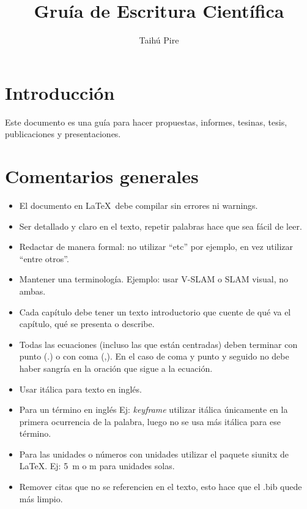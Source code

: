 \documentclass[a4paper,	11pt]{article}
\begin{document}
\title{Gruía de Escritura Científica}
\author{Taihú Pire}


\maketitle

\tableofcontents

\section{Introducción}

Este documento es una guía para hacer propuestas, informes, tesinas, tesis, publicaciones y presentaciones.

\section{Comentarios generales}
%
\begin{itemize}
    \item El documento en \LaTeX~debe compilar sin errores ni warnings.

    \item Ser detallado y claro en el texto, repetir palabras hace que sea fácil de leer.

    \item Redactar de manera formal: no utilizar ``etc'' por ejemplo, en vez utilizar ``entre otros''.

    \item Mantener una terminología. Ejemplo: usar V-SLAM o SLAM visual, no ambas.

    \item Cada capítulo debe tener un texto introductorio que cuente de qué va el capítulo, qué se presenta o describe.
    
    \item Todas las ecuaciones (incluso las que están centradas) deben terminar con punto (.) o con coma (,). En el caso de coma y punto y seguido no debe haber sangría en la oración que sigue a la ecuación.

    \item Usar itálica para texto en inglés.

    \item Para un término en inglés Ej: \emph{keyframe} utilizar itálica únicamente en la primera ocurrencia de la palabra, luego no se usa más itálica para ese término.

    \item Para las unidades o números con unidades utilizar el paquete siunitx de \LaTeX. Ej: \SI{5}{\meter} o \si{\meter} para unidades solas.

    \item Remover citas que no se referencien en el texto, esto hace que el .bib quede más limpio.
\end{itemize}
\end{document}
